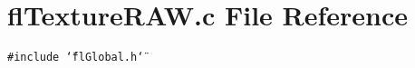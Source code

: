 \section{fl\-Texture\-RAW.c File Reference}
\label{flTextureRAW_8c}
{\tt \#include \char`\"{}fl\-Global.h\char`\"{}}\par
